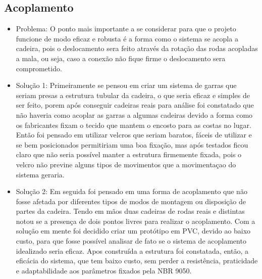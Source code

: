 \subsection{Acoplamento}
 \begin{itemize}
  \item Problema: O ponto mais importante a se considerar para que o projeto funcione de modo eficaz e robusta é a forma como o sistema se acopla a cadeira, pois o deslocamento sera feito através da rotação das rodas acopladas a mala, ou seja, caso  a conexão não fique firme o deslocamento sera comprometido.
  \item Solução 1: Primeiramente se pensou em criar um sistema de garras que seriam presas a estrutura tubular da cadeira, o que seria eficaz e simples de ser feito, porem após conseguir cadeiras reais para análise foi constatado que não haveria como acoplar as garras a algumas cadeiras devido a forma como os fabricantes fixam o tecido que mantem o encosto para as costas no lugar. Então foi pensado em utilizar velcros que seriam baratos, fáceis de utilizar e se bem posicionados permitiriam uma boa fixação, mas após testados ficou claro que não seria possível manter a estrutura firmemente fixada, pois o velcro não previne alguns tipos de movimentos que a movimentaçao do sistema geraria.

  \item Solução 2: Em seguida foi pensado em uma forma de acoplamento que não fosse afetada por diferentes tipos de modos de montagem ou disposição de partes da cadeira. Tendo em mãos duas cadeiras de rodas reais e distintas notou se a presença de dois pontos livres para realizar o acoplamento. Com a solução em mente foi decidido criar um protótipo em PVC, devido ao baixo custo, para que fosse possível analisar de fato se o sistema de acoplamento idealizado seria eficaz. Apos construída a estrutura foi constatada, então, a eficácia do sistema, que tem baixo custo, sem perder a resistência, praticidade e adaptabilidade aos parâmetros fixados pela NBR 9050.
 \end{itemize}

